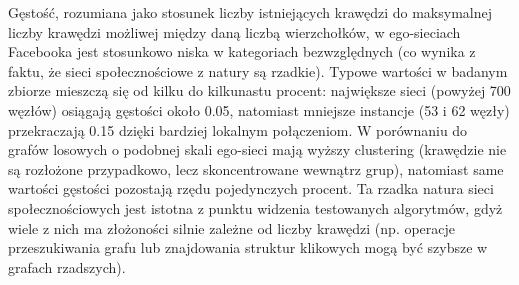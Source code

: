 Gęstość, rozumiana jako stosunek liczby istniejących krawędzi do maksymalnej liczby krawędzi możliwej między daną liczbą wierzchołków, w ego-sieciach Facebooka jest stosunkowo niska w kategoriach bezwzględnych (co wynika z faktu, że sieci społecznościowe z natury są rzadkie). Typowe wartości w badanym zbiorze mieszczą się od kilku do kilkunastu procent: największe sieci (powyżej 700 węzłów) osiągają gęstości około 0.05, natomiast mniejsze instancje (53 i 62 węzły) przekraczają 0.15 dzięki bardziej lokalnym połączeniom. W porównaniu do grafów losowych o podobnej skali ego-sieci mają wyższy clustering (krawędzie nie są rozłożone przypadkowo, lecz skoncentrowane wewnątrz grup), natomiast same wartości gęstości pozostają rzędu pojedynczych procent. Ta rzadka natura sieci społecznościowych jest istotna z punktu widzenia testowanych algorytmów, gdyż wiele z nich ma złożoności silnie zależne od liczby krawędzi (np. operacje przeszukiwania grafu lub znajdowania struktur klikowych mogą być szybsze w grafach rzadszych).

